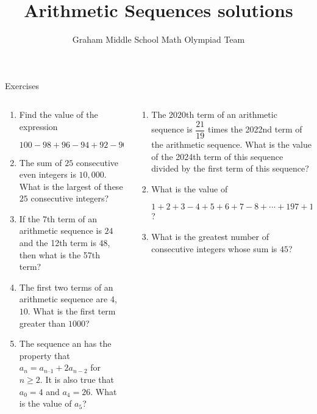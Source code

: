 \documentclass[9pt,aspectratio=169]{beamer}
\title{Arithmetic Sequences solutions}
\subtitle[Graham Middle School]{Graham Middle School Math Olympiad Team}
\begin{document}
\maketitle

\begin{frame}{Exercises}
  \begin{columns}[T]
    \begin{column}{0.5\textwidth}
      \begin{enumerate}
        \item Find the value of the expression
        
        $100-98+96-94+92-90+\cdots+8-6+4-2.$ %
        \item The sum of $25$ consecutive even integers is $10,000$. What is the largest of these $25$ consecutive integers? %
        \item If the 7th term of an arithmetic sequence is $24$ and the 12th term is $48$, then what is
        the 57th term? %
        \item The first two terms of an arithmetic sequence are $4$, $10$. What is the first term greater
        than $1000$? %
        \item The sequence an has the property that $a_{n} = a_{n – 1} + 2a_{n-2}$ for $n \geq 2$. It is also
        true that $a_0 = 4$ and $a_4 = 26$. What is the value of $a_{5}$? %
        \seti
      \end{enumerate}
    \end{column}
    \begin{column}{0.5\textwidth}
      \begin{enumerate}
        \conti
        \item The 2020th term of an arithmetic sequence is $\dfrac{21}
        {19}$ times the 2022nd term of the arithmetic sequence.
        What is the value of the 2024th term of this sequence divided by the first term of this sequence? %
        \item What is the value of

        $1+2+3-4+5+6+7-8+\cdots+197+198+199-200$? %
        \item What is the greatest number of consecutive integers whose sum is $45$? %
      \end{enumerate}
    \end{column}
  \end{columns}
\end{frame}
\end{document}
